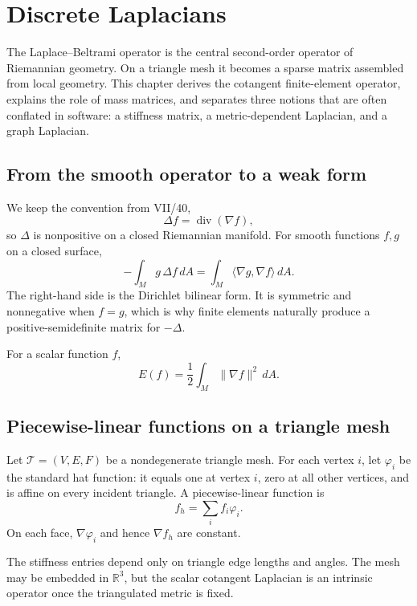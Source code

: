 \chapter{Discrete Laplacians}
\label{ch:vii41}

The Laplace--Beltrami operator is the central second-order operator of
Riemannian geometry.  On a triangle mesh it becomes a sparse matrix assembled
from local geometry.  This chapter derives the cotangent finite-element
operator, explains the role of mass matrices, and separates three notions that
are often conflated in software: a stiffness matrix, a metric-dependent
Laplacian, and a graph Laplacian.

\section{From the smooth operator to a weak form}

We keep the convention from VII/40,
\[
\Delta f=\operatorname{div}(\nabla f),
\]
so \(\Delta\) is nonpositive on a closed Riemannian manifold.  For smooth
functions \(f,g\) on a closed surface,
\[
-\int_M g\,\Delta f\,dA
=
\int_M \langle\nabla g,\nabla f\rangle\,dA.
\]
The right-hand side is the Dirichlet bilinear form.  It is symmetric and
nonnegative when \(f=g\), which is why finite elements naturally produce a
positive-semidefinite matrix for \(-\Delta\).

\begin{definition}\label{def:vii41-dirichlet}
For a scalar function \(f\),
\[
E(f)=\frac12\int_M\|\nabla f\|^2\,dA.
\]
\end{definition}

\section{Piecewise-linear functions on a triangle mesh}

Let \(\mathcal T=(V,E,F)\) be a nondegenerate triangle mesh.  For each vertex
\(i\), let \(\varphi_i\) be the standard hat function: it equals one at vertex
\(i\), zero at all other vertices, and is affine on every incident triangle.
A piecewise-linear function is
\[
f_h=\sum_i f_i\varphi_i.
\]
On each face, \(\nabla\varphi_i\) and hence \(\nabla f_h\) are constant.

\begin{remark}\label{rem:vii41-intrinsic}
The stiffness entries depend only on triangle edge lengths and angles.  The mesh
may be embedded in \(\mathbb R^3\), but the scalar cotangent Laplacian is an
intrinsic operator once the triangulated metric is fixed.
\end{remark}

